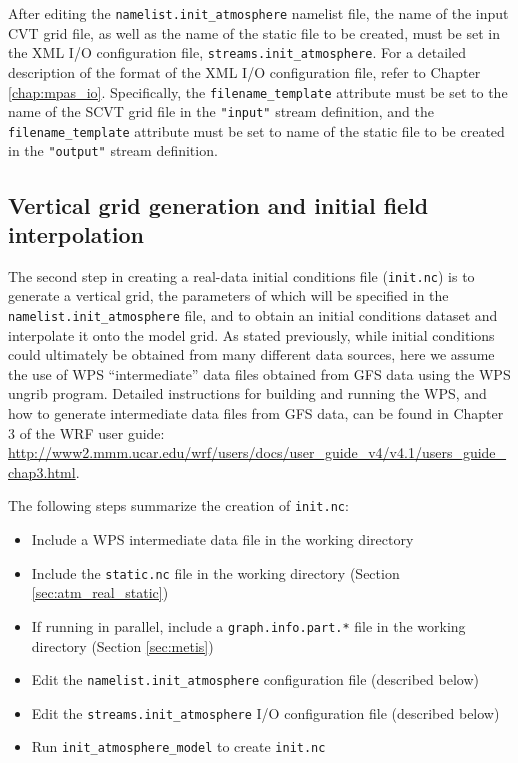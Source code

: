 \begin{longtable}{p{3.0in} |p{3.25in}}
\end{longtable}

After editing the {\tt namelist.init\_atmosphere} namelist file, the name of the input CVT grid file, as well as the name of the static file to be created, must be set in the XML I/O configuration file, {\tt streams.init\_atmosphere}. For a detailed description of the format of the XML I/O configuration file, refer to Chapter \ref{chap:mpas_io}. Specifically, the {\tt filename\_template} attribute must be set to the name of the SCVT grid file in the {\tt "input"} stream definition, and the {\tt filename\_template} attribute must be set to name of the static file to be created in the {\tt "output"} stream definition.



\subsection{Vertical grid generation and initial field interpolation}
\label{sec:atm_real_met}

The second step in creating a real-data initial conditions file ({\tt init.nc}) is to generate a vertical grid, the parameters of which will be specified in the {\tt namelist.init\_atmosphere} file, and to obtain an initial conditions dataset and interpolate it onto the model grid. As stated previously, while initial conditions could ultimately be obtained from many different data sources, here we assume the use of WPS ``intermediate'' data files obtained from GFS data using the WPS ungrib program.  Detailed instructions for building and running the WPS, and how to generate intermediate data files from GFS data, can be found in Chapter 3 of the WRF user guide: \\
\url{http://www2.mmm.ucar.edu/wrf/users/docs/user_guide_v4/v4.1/users_guide_chap3.html}.

The following steps summarize the creation of {\tt init.nc}:

\begin{itemize}
\item Include a WPS intermediate data file in the working directory
\item Include the {\tt static.nc} file in the working directory (Section \ref{sec:atm_real_static})
\item If running in parallel, include a {\tt graph.info.part.*} file in the working directory (Section \ref{sec:metis})
\item Edit the {\tt namelist.init\_atmosphere} configuration file (described below)
\item Edit the {\tt streams.init\_atmosphere} I/O configuration file (described below)
\item Run {\tt init\_atmosphere\_model} to create {\tt init.nc}
\end{itemize}


